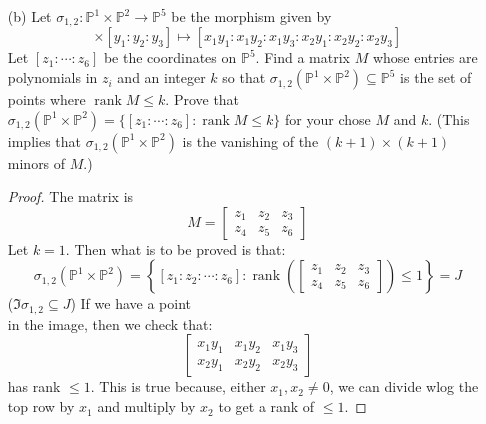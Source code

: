 \documentclass{article}
\begin{document}
\begin{itemize}
        \item [(b)] Let $\sigma_{1, 2} : \mathbb{P}^{1} \times \mathbb{P}^{2} \rightarrow \mathbb{P}^{5}$ be the morphism given by
            \begin{equation*}
                [x_{1} : x_{2}] \times [y_{1} : y_{2} : y_{3}] \mapsto [x_{1}y_{1} : x_{1}y_{2} : x_{1}y_{3} : x_{2}y_{1} : x_{2}y_{2} : x_{2}y_{3}]
            \end{equation*}
        Let $[z_{1} : \cdots : z_{6}]$ be the coordinates on $\mathbb{P}^{5}$. Find a matrix $M$ whose entries are polynomials in $z_{i}$ and an integer $k$ so that $\sigma_{1, 2} (\mathbb{P}^{1} \times \mathbb{P}^{2}) \subseteq \mathbb{P}^{5}$ is the set of points where $\mathop{rank}M \leq k$. Prove that $\sigma_{1, 2}(\mathbb{P}^{1}\times \mathbb{P}^{2}) = \{[z_{1} : \cdots : z_{6}] : \mathop{rank}M \leq k\}$ for your chose $M$ and $k$. (This implies that $\sigma_{1, 2}(\mathbb{P}^{1} \times \mathbb{P}^{2})$ is the vanishing of the $(k + 1) \times (k + 1)$ minors of $M$.)
            \begin{proof}
                The matrix is
                    \begin{equation*}
                        M = \begin{bmatrix}
                            z_{1} & z_{2} & z_{3} \\
                            z_{4} & z_{5} & z_{6}   
                        \end{bmatrix}
                    \end{equation*}
                Let $k = 1$. Then what is to be proved is that:
                    \begin{equation*}
                        \sigma_{ 1, 2}(\mathbb{P}^{1} \times \mathbb{ P}^{2}) = \left\{[z_{1} : z_{2} : \cdots : z_{ 6}] : \mathop{rank} \left(\begin{bmatrix}
                            z_{1} & z_{2} & z_{3} \\
                            z_{4} & z_{5} & z_{6}   
                        \end{bmatrix}\right) \leq 1\right\} = J
                    \end{equation*}
                ($\Im{\sigma_{ 1, 2}} \subseteq J$) If we have a point 
                    \begin{equation*}
                        [x_{1}y_{1} : x_{1}y_{2} : x_{1}y_{3} : x_{2}y_{1} : x_{2}y_{2} : x_{2}y_{3}]
                    \end{equation*}
                in the image, then we check that:
                    \begin{equation*}
                        \begin{bmatrix}
                            x_{1}y_{1} & x_{1}y_{2} & x_{1}y_{3} \\
                            x_{2}y_{1} & x_{2}y_{2} & x_{2}y_{3}   
                        \end{bmatrix}
                    \end{equation*}
                has rank $ \leq 1$. This is true because, either $x_{1}, x_{2} \neq 0$, we can divide wlog the top row by $x_{1}$ and multiply by $x_{2}$ to get a rank of $\leq 1$. 


\end{proof}
\end{itemize}
\end{document}
